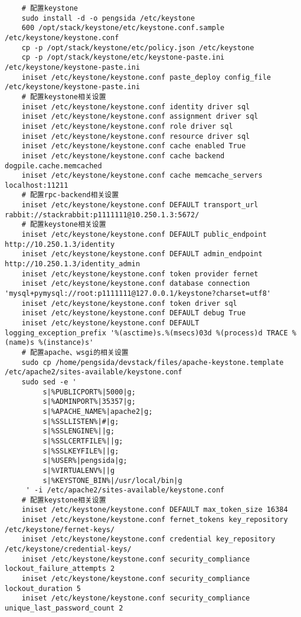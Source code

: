 \documentclass[a4paper,left=1.5cm,right=1.5cm,11pt]{article}
\begin{document}
\begin{lstlisting}
	# 配置keystone
	sudo install -d -o pengsida /etc/keystone
	600 /opt/stack/keystone/etc/keystone.conf.sample /etc/keystone/keystone.conf
    cp -p /opt/stack/keystone/etc/policy.json /etc/keystone
    cp -p /opt/stack/keystone/etc/keystone-paste.ini /etc/keystone/keystone-paste.ini
    iniset /etc/keystone/keystone.conf paste_deploy config_file /etc/keystone/keystone-paste.ini
	# 配置keystone相关设置
	iniset /etc/keystone/keystone.conf identity driver sql
    iniset /etc/keystone/keystone.conf assignment driver sql
    iniset /etc/keystone/keystone.conf role driver sql
    iniset /etc/keystone/keystone.conf resource driver sql
    iniset /etc/keystone/keystone.conf cache enabled True
    iniset /etc/keystone/keystone.conf cache backend dogpile.cache.memcached
    iniset /etc/keystone/keystone.conf cache memcache_servers localhost:11211
	# 配置rpc-backend相关设置
	iniset /etc/keystone/keystone.conf DEFAULT transport_url rabbit://stackrabbit:p1111111@10.250.1.3:5672/
	# 配置keystone相关设置
	iniset /etc/keystone/keystone.conf DEFAULT public_endpoint http://10.250.1.3/identity
    iniset /etc/keystone/keystone.conf DEFAULT admin_endpoint http://10.250.1.3/identity_admin
	iniset /etc/keystone/keystone.conf token provider fernet
	iniset /etc/keystone/keystone.conf database connection 'mysql+pymysql://root:p1111111@127.0.0.1/keystone?charset=utf8'
    iniset /etc/keystone/keystone.conf token driver sql
	iniset /etc/keystone/keystone.conf DEFAULT debug True
	iniset /etc/keystone/keystone.conf DEFAULT logging_exception_prefix '%(asctime)s.%(msecs)03d %(process)d TRACE %(name)s %(instance)s'
	# 配置apache、wsgi的相关设置
	sudo cp /home/pengsida/devstack/files/apache-keystone.template /etc/apache2/sites-available/keystone.conf
	sudo sed -e '
         s|%PUBLICPORT%|5000|g;
         s|%ADMINPORT%|35357|g;
         s|%APACHE_NAME%|apache2|g;
         s|%SSLLISTEN%|#|g;
         s|%SSLENGINE%||g;
         s|%SSLCERTFILE%||g;
         s|%SSLKEYFILE%||g;
         s|%USER%|pengsida|g;
         s|%VIRTUALENV%||g
         s|%KEYSTONE_BIN%|/usr/local/bin|g
     ' -i /etc/apache2/sites-available/keystone.conf
	# 配置keystone相关设置
	iniset /etc/keystone/keystone.conf DEFAULT max_token_size 16384
    iniset /etc/keystone/keystone.conf fernet_tokens key_repository /etc/keystone/fernet-keys/
    iniset /etc/keystone/keystone.conf credential key_repository /etc/keystone/credential-keys/
	iniset /etc/keystone/keystone.conf security_compliance lockout_failure_attempts 2
    iniset /etc/keystone/keystone.conf security_compliance lockout_duration 5
    iniset /etc/keystone/keystone.conf security_compliance unique_last_password_count 2


\end{lstlisting}
\end{document}
